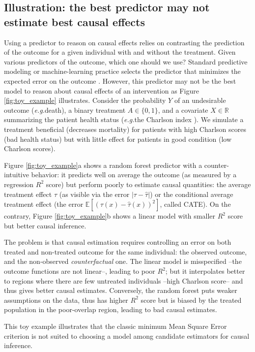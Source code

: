 \documentclass[10pt,twocolumn]{article}
\newcommand{\eg}{\emph{e.g.}}
\begin{document}
\subsection{Illustration: the best predictor may not estimate best causal
    effects}%

Using a predictor to reason on causal effects relies on contrasting the
prediction of the outcome for a given individual with and without the treatment.
%
Given various predictors of the outcome, which one should we use?
%
Standard predictive modeling or machine-learning practice selects the predictor
that minimizes the expected error on the outcome
\citep{poldrack2020establishment,varoquaux2022evaluating}. However, this
predictor may not be the best model to reason about causal effects of an
intervention as Figure \ref{fig:toy_example} illustrates. Consider the
probability $Y$ of an undesirable outcome (\eg death), a binary treatment $A \in
    \{0, 1\}$, and a covariate $X \in \mathbb R$ summarizing the patient health
status (\eg the Charlson index \cite{charlson_new_1987}). We simulate a
treatment beneficial (decreases mortality) for patients with high Charlson
scores (bad health status) but with little effect for patients in good condition
(low Charlson scores).


Figure \ref{fig:toy_example}a shows a random forest predictor with a
counter-intuitive behavior: it predicts well on average the outcome (as measured
by a regression $R^2$ score) but perform poorly to estimate causal quantities:
the average treatment effect $\tau$ (as visible via the error $|\tau -
    \hat{\tau}|$) or the conditional average treatment effect (the error
$\mathbb{E}[(\tau(x) - \hat{\tau}(x))^2]$, called CATE).
%
On the contrary, Figure \ref{fig:toy_example}b shows a linear model with
smaller $R^2$ score but better causal inference.%

The problem is that causal estimation requires controlling
an error on both treated and non-treated outcome for the same individual:
the observed outcome, and the non-observed \emph{counterfactual} one.
The linear model is misspecified --the outcome functions are not
linear--, leading to poor $R^2$; but it interpolates better to regions
where there are few untreated individuals --high Charlson score-- and
thus gives better causal estimates. Conversely, the random forest puts
weaker assumptions on the data, thus has higher $R^2$ score but is biased
by the treated population in the poor-overlap region, leading
to bad causal estimates.

This toy example illustrates that the classic minimum Mean Square Error
criterion is not suited to choosing a model among candidate
estimators for causal inference.
\end{document}
